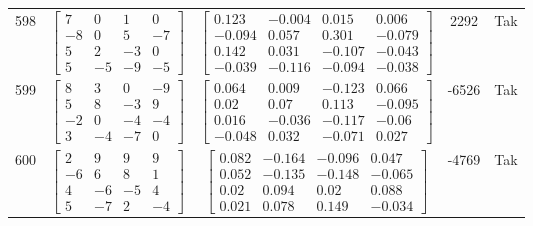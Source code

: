\documentclass[a4paper,12pt]{article}
\begin{document}
\begin{tabular}{c c c c c}
598
&
$\begin{bmatrix} 7 & 0 & 1 & 0 \\ -8 & 0 & 5 & -7 \\ 5 & 2 & -3 & 0 \\ 5 & -5 & -9 & -5 \end{bmatrix}$
&
$\begin{bmatrix} 0.123 & -0.004 & 0.015 & 0.006 \\ -0.094 & 0.057 & 0.301 & -0.079 \\ 0.142 & 0.031 & -0.107 & -0.043 \\ -0.039 & -0.116 & -0.094 & -0.038 \end{bmatrix}$
&
2292
&
Tak
\\
599
&
$\begin{bmatrix} 8 & 3 & 0 & -9 \\ 5 & 8 & -3 & 9 \\ -2 & 0 & -4 & -4 \\ 3 & -4 & -7 & 0 \end{bmatrix}$
&
$\begin{bmatrix} 0.064 & 0.009 & -0.123 & 0.066 \\ 0.02 & 0.07 & 0.113 & -0.095 \\ 0.016 & -0.036 & -0.117 & -0.06 \\ -0.048 & 0.032 & -0.071 & 0.027 \end{bmatrix}$
&
-6526
&
Tak
\\
600
&
$\begin{bmatrix} 2 & 9 & 9 & 9 \\ -6 & 6 & 8 & 1 \\ 4 & -6 & -5 & 4 \\ 5 & -7 & 2 & -4 \end{bmatrix}$
&
$\begin{bmatrix} 0.082 & -0.164 & -0.096 & 0.047 \\ 0.052 & -0.135 & -0.148 & -0.065 \\ 0.02 & 0.094 & 0.02 & 0.088 \\ 0.021 & 0.078 & 0.149 & -0.034 \end{bmatrix}$
&
-4769
&
Tak
\\
\end{tabular} \egroup \newpage
\end{document}
